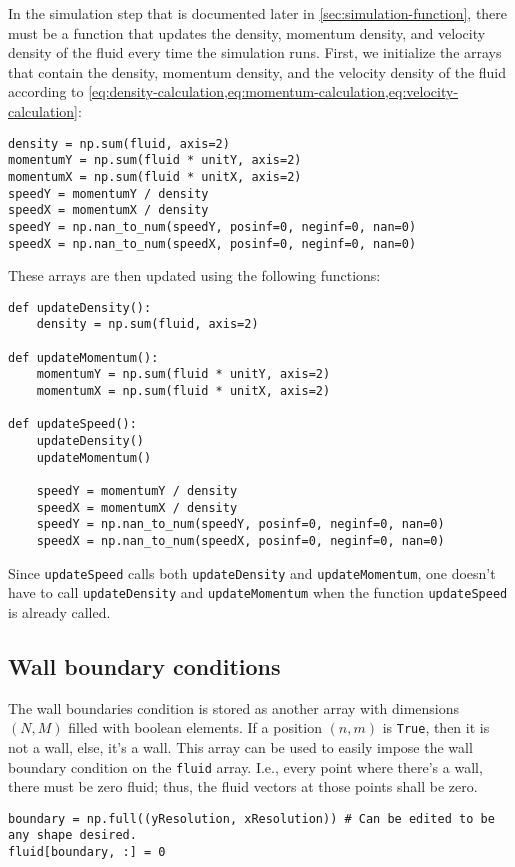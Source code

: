 In the simulation step that is documented later in \cref{sec:simulation-function}, there must be a function that updates the density, momentum density, and velocity density of the fluid every time the simulation runs. First, we initialize the arrays that contain the density, momentum density, and the velocity density of the fluid according to \cref{eq:density-calculation,eq:momentum-calculation,eq:velocity-calculation}:
\begin{verbatim}
density = np.sum(fluid, axis=2)
momentumY = np.sum(fluid * unitY, axis=2)
momentumX = np.sum(fluid * unitX, axis=2)
speedY = momentumY / density
speedX = momentumX / density
speedY = np.nan_to_num(speedY, posinf=0, neginf=0, nan=0)
speedX = np.nan_to_num(speedX, posinf=0, neginf=0, nan=0)
\end{verbatim}
These arrays are then updated using the following functions:
\begin{verbatim}
def updateDensity():
    density = np.sum(fluid, axis=2)

def updateMomentum():
    momentumY = np.sum(fluid * unitY, axis=2)
    momentumX = np.sum(fluid * unitX, axis=2)

def updateSpeed():
    updateDensity()
    updateMomentum()

    speedY = momentumY / density
    speedX = momentumX / density
    speedY = np.nan_to_num(speedY, posinf=0, neginf=0, nan=0)
    speedX = np.nan_to_num(speedX, posinf=0, neginf=0, nan=0)
\end{verbatim}
Since \texttt{updateSpeed} calls both \texttt{updateDensity} and \texttt{updateMomentum}, one doesn't have to call \texttt{updateDensity} and \texttt{updateMomentum} when the function \texttt{updateSpeed} is already called.

\subsection{Wall boundary conditions}

The wall boundaries condition is stored as another array with dimensions $(N, M)$ filled with boolean elements. If a position $(n, m)$ is \texttt{True}, then it is not a wall, else, it's a wall. This array can be used to easily impose the wall boundary condition on the \texttt{fluid} array. I.e., every point where there's a wall, there must be zero fluid; thus, the fluid vectors at those points shall be zero.
\begin{verbatim}
boundary = np.full((yResolution, xResolution)) # Can be edited to be any shape desired.
fluid[boundary, :] = 0
\end{verbatim}

